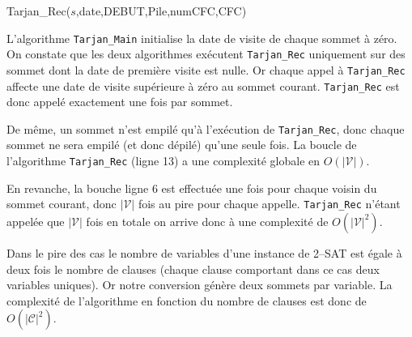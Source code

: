 \begin{enumerate}[(a)]
\begin{algorithm}[H]
  \caption{Tarjan\_Rec($s$,date,DEBUT,Pile,numCFC,CFC)}
\end{algorithm}

L'algorithme \texttt{Tarjan\_Main} initialise la date de visite de chaque sommet à zéro. On constate que les deux algorithmes exécutent \texttt{Tarjan\_Rec} uniquement sur des sommet dont la date de première visite est nulle. Or chaque appel à \texttt{Tarjan\_Rec} affecte une date de visite supérieure à zéro au sommet courant. \texttt{Tarjan\_Rec} est donc appelé exactement une fois par sommet.

De même, un sommet n'est empilé qu'à l'exécution de \texttt{Tarjan\_Rec}, donc chaque sommet ne sera empilé (et donc dépilé) qu'une seule fois. La boucle de l'algorithme \texttt{Tarjan\_Rec} (ligne 13) a une complexité globale en $O(|\mathcal{V}|)$.

En revanche, la bouche ligne 6 est effectuée une fois pour chaque voisin du sommet courant, donc $|\mathcal{V}|$ fois au pire pour chaque appelle. \texttt{Tarjan\_Rec} n'étant appelée que $|\mathcal{V}|$ fois en totale on arrive donc à une complexité de $O(|\mathcal{V}|^2)$.

Dans le pire des cas le nombre de variables d'une instance de 2--SAT est égale à deux fois le nombre de clauses (chaque clause comportant dans ce cas deux variables uniques). Or notre conversion génère deux sommets par variable. La complexité de l'algorithme en fonction du nombre de clauses est donc de $O(|\mathcal{C}|^2)$.


\end{enumerate}
